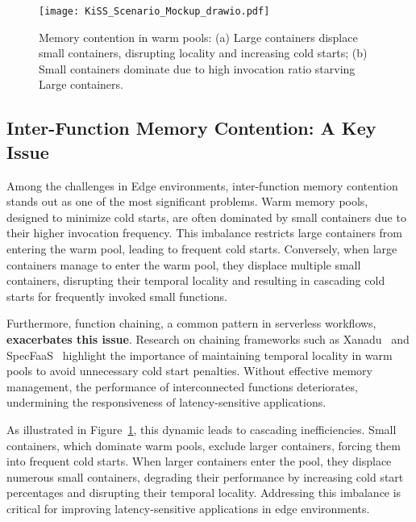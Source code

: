 \begin{figure}[tb!] 
    \centering 
    \texttt{[image: KiSS\_Scenario\_Mockup\_drawio.pdf]} 
    \caption{Memory contention in warm pools: (a) Large containers displace small containers, disrupting locality and increasing cold starts; (b) Small containers dominate due to high invocation ratio starving Large containers.} 
    \label{fig:intro_pools} 
\end{figure}
\subsection{Inter-Function Memory Contention: A Key Issue}
Among the challenges in Edge environments, inter-function memory contention stands out as one of the most significant problems. Warm memory pools, designed to minimize cold starts, are often dominated by small containers due to their higher invocation frequency. This imbalance restricts large containers from entering the warm pool, leading to frequent cold starts. Conversely, when large containers manage to enter the warm pool, they displace multiple small containers, disrupting their temporal locality and resulting in cascading cold starts for frequently invoked small functions.

Furthermore, function chaining, a common pattern in serverless workflows,\textbf{ exacerbates this issue}. Research on chaining frameworks such as Xanadu~\cite{daw_xanadu_2020} and SpecFaaS~\cite{stojkovic_specfaas_2023} highlight the importance of maintaining temporal locality in warm pools to avoid unnecessary cold start penalties. Without effective memory management, the performance of interconnected functions deteriorates, undermining the responsiveness of latency-sensitive applications.

As illustrated in Figure~\ref{fig:intro_pools}, this dynamic leads to cascading inefficiencies. Small containers, which dominate warm pools, exclude larger containers, forcing them into frequent cold starts. When larger containers enter the pool, they displace numerous small containers, degrading their performance by increasing cold start percentages and disrupting their temporal locality. Addressing this imbalance is critical for improving latency-sensitive applications in edge environments. 

